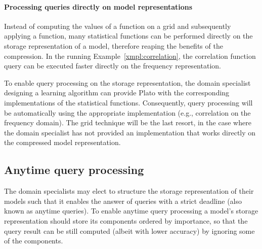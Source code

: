 
\paragraph{Processing queries directly on model representations}
Instead of computing the values of a function on a grid and subsequently applying a function, many statistical functions can be performed directly on the storage representation of a model, therefore reaping the benefits of the compression. In the running Example~\ref{xmpl:correlation}, the correlation function query can be executed faster directly on the frequency representation.%

To enable query processing on the storage representation, the domain specialist designing a learning algorithm can provide Plato with the corresponding implementations of the statistical functions. Consequently, query processing will be automatically using the appropriate implementation (e.g., correlation on the frequency domain). The grid technique will be the last resort, in the case where the domain specialist has not provided an implementation that works directly on the compressed model representation.


\subsection{Anytime query processing}
\label{sec:anytime}
The domain specialists may elect to structure the storage representation of their models such that it enables the answer of queries with a strict deadline (also known as anytime queries). To enable anytime query processing a model's storage representation should store its components ordered by importance, so that the query result can be still computed (albeit with lower accuracy) by ignoring some of the components.

